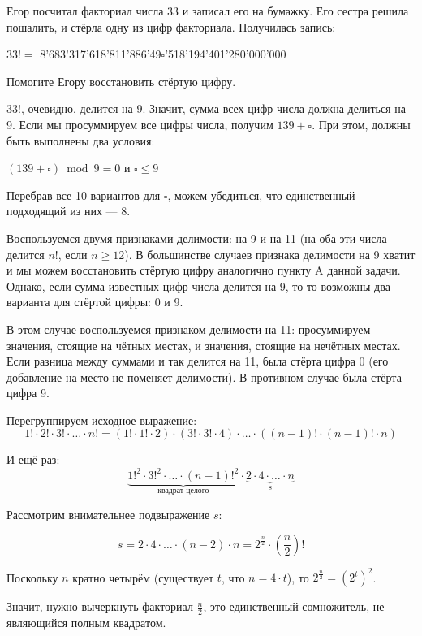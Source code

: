\begin{itemize}
\itA Егор посчитал факториал числа 33 и записал его на бумажку. 
Его сестра решила пошалить, и стёрла одну из цифр факториала. Получилась запись: \smallskip \\
\centerline{$33!=$ 8'683'317'618'811'886'49$\square$'518'194'401'280'000'000} \smallskip
Помогите Егору восстановить стёртую цифру.

$33!$, очевидно, делится на 9. Значит, сумма всех цифр числа должна делиться на 9.
Если мы просуммируем все цифры числа, получим $139+\square$. При этом, должны быть выполнены
два условия:
\begin{center} 
$(139+\square) \bmod 9 = 0$ и $\square \le 9$
\end{center}

Перебрав все 10 вариантов
для $\square$, можем убедиться, что единственный подходящий из них --- 8.

\itB Воспользуемся двумя признаками делимости: на 9 и на 11 (на оба эти числа делится $n!$, если $n \ge 12$).
В большинстве случаев признака делимости на 9 хватит и мы можем восстановить стёртую цифру аналогично
пункту A данной задачи. Однако, если сумма известных цифр числа делится на 9, то
то возможны два варианта для стёртой цифры: 0 и 9.

В этом случае воспользуемся признаком делимости на 11: просуммируем значения, стоящие на чётных местах,
и значения, стоящие на нечётных местах. Если разница между суммами и так делится на 11, была стёрта цифра 0
(его добавление на место не поменяет делимости). В противном случае была стёрта цифра 9.

\itC Перегруппируем исходное выражение:
$$1! \cdot 2! \cdot 3! \cdot \ldots \cdot n! = (1! \cdot 1! \cdot 2) \cdot (3! \cdot 3! \cdot 4) \cdot \ldots \cdot ((n-1)! \cdot (n-1)! \cdot n)$$

И ещё раз:
$$\underbrace{1!^2 \cdot 3!^2 \cdot \ldots \cdot (n-1)!^2}_\textrm{квадрат целого} \cdot \underbrace{2 \cdot 4 \cdot \ldots \cdot n}_\textrm{s}$$

Рассмотрим внимательнее подвыражение $s$:

$$s = 2 \cdot 4 \cdot \ldots \cdot (n-2) \cdot n = 2^{\frac{n}{2}} \cdot \left(\frac{n}{2}\right)!$$

Поскольку $n$ кратно четырём (существует $t$, что $n = 4\cdot t$), то 
$2^{\frac{n}{2}} = (2^t)^2$.

Значит, нужно вычеркнуть факториал $\frac{n}{2}$, это единственный сомножитель, не являющийся полным квадратом.

\end{itemize}
